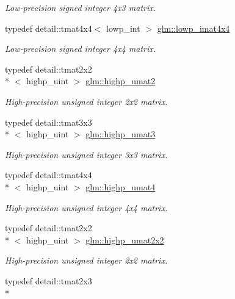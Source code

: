 \begin{DoxyCompactItemize}
\begin{DoxyCompactList}\small\item\em Low-\/precision signed integer 4x3 matrix. \end{DoxyCompactList}\item 
typedef detail\-::tmat4x4$<$ lowp\-\_\-int $>$ \hyperlink{group__gtc__matrix__integer_gaac17bd47c20d89a75d933f21e79e3411}{glm\-::lowp\-\_\-imat4x4}
\begin{DoxyCompactList}\small\item\em Low-\/precision signed integer 4x4 matrix. \end{DoxyCompactList}\item 
typedef detail\-::tmat2x2\\*
$<$ highp\-\_\-uint $>$ \hyperlink{group__gtc__matrix__integer_ga65158bd3fa138afe2c389a8e50e22c27}{glm\-::highp\-\_\-umat2}
\begin{DoxyCompactList}\small\item\em High-\/precision unsigned integer 2x2 matrix. \end{DoxyCompactList}\item 
typedef detail\-::tmat3x3\\*
$<$ highp\-\_\-uint $>$ \hyperlink{group__gtc__matrix__integer_ga0d2f0c76700809151e4582977bdc4c1d}{glm\-::highp\-\_\-umat3}
\begin{DoxyCompactList}\small\item\em High-\/precision unsigned integer 3x3 matrix. \end{DoxyCompactList}\item 
typedef detail\-::tmat4x4\\*
$<$ highp\-\_\-uint $>$ \hyperlink{group__gtc__matrix__integer_gabf91e4747e9aad3d2b58c79da5d9b0d3}{glm\-::highp\-\_\-umat4}
\begin{DoxyCompactList}\small\item\em High-\/precision unsigned integer 4x4 matrix. \end{DoxyCompactList}\item 
typedef detail\-::tmat2x2\\*
$<$ highp\-\_\-uint $>$ \hyperlink{group__gtc__matrix__integer_ga3d03c649a79dcf3c8b3f766e1c5e7870}{glm\-::highp\-\_\-umat2x2}
\begin{DoxyCompactList}\small\item\em High-\/precision unsigned integer 2x2 matrix. \end{DoxyCompactList}\item 
typedef detail\-::tmat2x3\\*

\end{DoxyCompactItemize}
